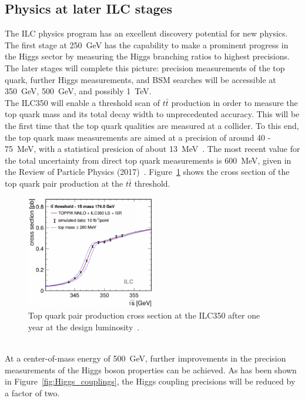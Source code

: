 \subsection{Physics at later ILC stages}
\label{Physics_later_stages}
The ILC physics program has an excellent discovery potential for new physics.
The first stage at \SI{250}{\GeV} has the capability to make a prominent progress in the Higgs sector by measuring the Higgs branching ratios to highest precisions.
The later stages will complete this picture: 
precision measurements of the top quark, further Higgs measurements, and BSM searches will be accessible at \SI{350}{\GeV}, \SI{500}{\GeV}, and possibly \SI{1}{\TeV}.
\\The ILC350 will enable a threshold scan of $t\bar{t}$ production in order to measure the top quark mass and its total decay width to unprecedented accuracy.
This will be the first time that the top quark qualities are measured at a \positron\electron collider. 
To this end, the top quark mass measurements are aimed at a precision of around 40 - \SI{75}{\MeV}, with a statistical presicion of about \SI{13}{\MeV}~\cite[p. 24]{ILC_Discovery}.
The most recent value for the total uncertainty from direct top quark measurements is \SI{600}{\MeV}, given in the Review of Particle Physics (2017)~\cite{PDG2017}.
Figure~\ref{fig:Top_cross} shows the cross section of the top quark pair production at the $t\bar{t}$ threshold.
\begin{figure}
\centering
\includegraphics[width=0.5\textwidth]{Figures/Top_mass.pdf}
\caption[Top quark pair production cross section]{Top quark pair production cross section at the ILC350 after one year at the design luminosity~\cite[p. 15]{ILCPhysics}.}
\label{fig:Top_cross}
\end{figure}
\\At a center-of-mass energy of \SI{500}{\GeV}, further improvements in the precision measurements of the Higgs boson properties can be achieved.
As has been shown in Figure~\ref{fig:Higgs_couplings}, the Higgs coupling precisions will be reduced by a factor of two.
